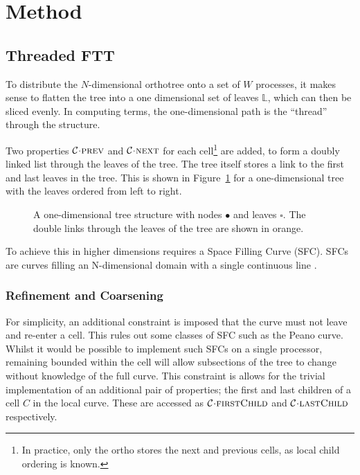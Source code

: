 \documentclass[twoside]{IIBproject}
\newcommand{\acc}{{\mkern 0.5mu\cdot\mkern 0.5mu}}
\numberwithin{figure}{section}
\begin{document}




\section{Method} %
    \label{sec:method}

    \subsection{Threaded FTT} %
        \label{sec:tftt}

        To distribute the $N$-dimensional orthotree onto a set of $W$ processes, it makes sense to flatten the tree into a one dimensional set of leaves $\mathbb{L}$, which can then be sliced evenly. In computing terms, the one-dimensional path is the ``thread'' through the structure. 

        Two properties $\mathcal{C}\acc\textproc{prev}$ and $\mathcal{C}\acc\textproc{next}$ for each cell\footnote{In practice, only the ortho stores the next and previous cells, as local child ordering is known.} are added, to form a doubly linked list through the leaves of the tree. The tree itself stores a link to the first and last leaves in the tree. This is shown in Figure~\ref{fig:tftt-flattree} for a one-dimensional tree with the leaves ordered from left to right. 

        \begin{figure}[!htbp]
            \centering
            
            \caption{A one-dimensional tree structure with nodes $\bullet$ and leaves $\square$. The double links through the leaves of the tree are shown in orange.}
            \label{fig:tftt-flattree}
        \end{figure}

        To achieve this in higher dimensions requires a Space Filling Curve (SFC). SFCs are curves filling an N-dimensional domain with a single continuous line \cite{bader2013}. 


        \subsubsection{Refinement and Coarsening} %
            \label{sec:tftt-refine}

            For simplicity, an additional constraint is imposed that the curve must not leave and re-enter a cell. This rules out some classes of SFC such as the Peano curve. Whilst it would be possible to implement such SFCs on a single processor, remaining bounded within the cell will allow subsections of the tree to change without knowledge of the full curve. This constraint is allows for the trivial implementation of  an additional pair of properties; the first and last children of a cell $C$ in the local curve. These are accessed as $\mathcal{C}\acc\textproc{firstChild}$ and $\mathcal{C}\acc\textproc{lastChild}$ respectively.
\end{document}
